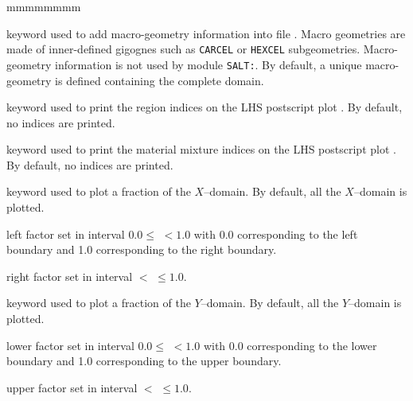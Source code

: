 \begin{ListeDeDescription}{mmmmmmmm}
\item[\moc{MACRO}] keyword used to add macro-geometry information into file . Macro geometries are made of inner-defined gigognes such as {\tt CARCEL}
or {\tt HEXCEL} subgeometries. Macro-geometry information is not used by module {\tt SALT:}. By default, a unique macro-geometry is defined containing the complete domain.

\item[\moc{DRAWNOD}] keyword used to print the region indices on the LHS postscript plot . By default, no indices are printed.

\item[\moc{DRAWMIX}] keyword used to print the material mixture indices on the LHS postscript plot . By default, no indices are printed.

\item[\moc{ZOOMX}] keyword used to plot a fraction of the $X$--domain. By default, all the $X$--domain is plotted.

\item[\dusa{facx1}] left factor set in interval $0.0 \le$  $< 1.0$ with 0.0 corresponding to the left boundary and 1.0 corresponding to the right boundary.

\item[\dusa{facx2}] right factor set in interval  $<$  $\le 1.0$.

\item[\moc{ZOOMY}] keyword used to plot a fraction of the $Y$--domain. By default, all the $Y$--domain is plotted.

\item[\dusa{facy1}] lower factor set in interval  $0.0 \le$  $< 1.0$ with 0.0 corresponding to the lower boundary and 1.0 corresponding to the upper boundary.

\item[\dusa{facy2}] upper factor set in interval  $<$  $\le 1.0$.

\end{ListeDeDescription}


\clearpage
